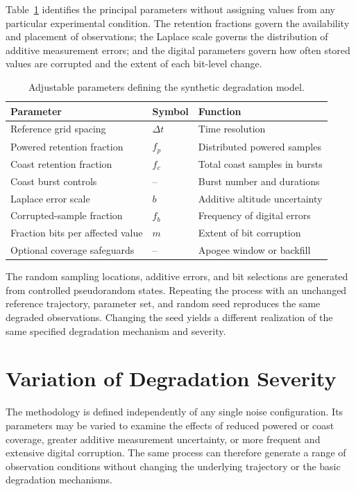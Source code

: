 Table~\ref{tab:noise-model-parameters} identifies the principal
parameters without assigning values from any particular experimental
condition. The retention fractions govern the availability and
placement of observations; the Laplace scale governs the distribution
of additive measurement errors; and the digital parameters govern
how often stored values are corrupted and the extent of each
bit-level change.

\begin{table}[htbp]
    \centering
    \caption{Adjustable parameters defining the synthetic degradation model.}
    \label{tab:noise-model-parameters}
    \begin{tabular}{lll}
        \hline
        Parameter & Symbol & Function \\
        \hline
        Reference grid spacing & $\Delta t$ & Time resolution \\
        Powered retention fraction & $f_p$ & Distributed powered samples \\
        Coast retention fraction & $f_c$ & Total coast samples in bursts \\
        Coast burst controls & -- & Burst number and durations \\
        Laplace error scale & $b$ & Additive altitude uncertainty \\
        Corrupted-sample fraction & $f_b$ & Frequency of digital errors \\
        Fraction bits per affected value & $m$ & Extent of bit corruption \\
        Optional coverage safeguards & -- & Apogee window or backfill \\
        \hline
    \end{tabular}
\end{table}

The random sampling locations, additive errors, and bit selections
are generated from controlled pseudorandom states. Repeating the
process with an unchanged reference trajectory, parameter set,
and random seed reproduces the same degraded observations.
Changing the seed yields a different realization of the same
specified degradation mechanism and severity.

\section{Variation of Degradation Severity}
\label{sec:noise-severity}

The methodology is defined independently of any single noise
configuration. Its parameters may be varied to examine the
effects of reduced powered or coast coverage, greater additive
measurement uncertainty, or more frequent and extensive
digital corruption. The same process can therefore generate
a range of observation conditions without changing the
underlying trajectory or the basic degradation mechanisms.

